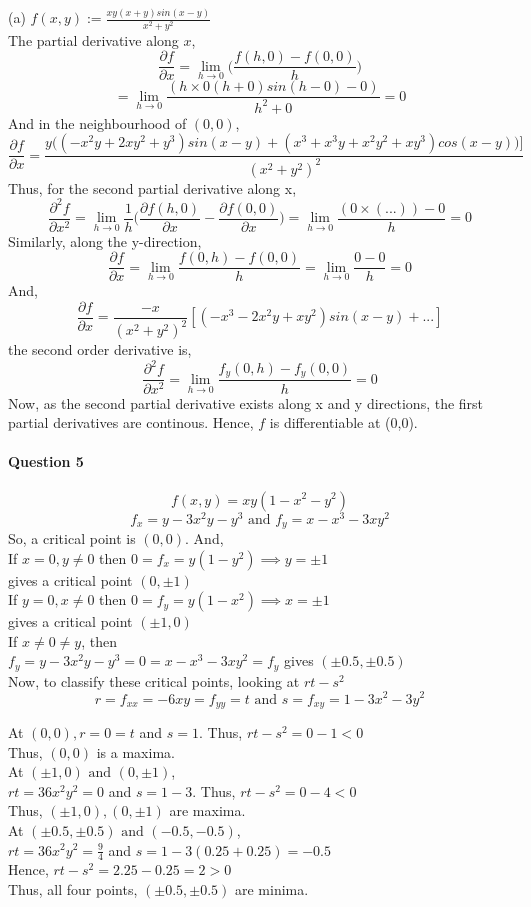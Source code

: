 \documentclass[20pt,a4paper]{extarticle} %
\theoremstyle{definition}
\theoremstyle{definition}
\begin{document}
(a) $f(x,y):=\frac{xy(x+y)sin(x-y)}{x^2+y^2}$\\
The partial derivative along $x$,
\[ \frac{\partial f}{\partial x} =\lim_{h \to 0} \Big( \frac{f(h,0)-f(0,0)}{h} \Big) \]
\[=\lim_{h \to 0} \frac{(h\times 0(h+0)sin(h-0)-0)}{h^2+0}=0 \]
And in the neighbourhood of $(0,0)$,
\[ \frac{\partial f}{\partial x} = \frac{y\big( (-x^2y+2xy^2+y^3)sin(x-y)+(x^3+x^3y+x^2y^2+xy^3)cos(x-y) \big)]}{(x^2+y^2)^2} \]
Thus, for the second partial derivative along x,
\[ \frac{\partial^2 f}{\partial x^2}=\lim_{h \to 0} \frac{1}{h} \Big( \frac{\partial f (h,0)}{\partial x}
-\frac{\partial f (0,0)}{\partial x} \Big)= \lim_{h \to 0} \frac{(0\times (...))-0}{h}=0 \]
Similarly, along the y-direction, \\
\[ \frac{\partial f}{\partial x} = \lim_{h \to 0} \frac{f(0,h)-f(0,0)}{h}= \lim_{h \to 0}
\frac{0-0}{h}=0\]
And,
\[  \frac{\partial f}{\partial x} = \frac{-x}{(x^2+y^2)^2}[(-x^3-2x^2y+xy^2)sin(x-y)+...]\]
the second order derivative is,
\[ \frac{\partial^2 f}{\partial x^2} = \lim_{h \to 0} \frac{f_y(0,h)-f_y(0,0)}{h}=0 \]
Now, as the second partial derivative exists along x and y directions, the first partial derivatives are continous. Hence, $f$ is differentiable at (0,0).
\newpage
\paragraph{Question 5}
\[ f(x,y)=xy(1-x^2-y^2) \]
\[ f_x=y-3x^2y-y^3 \text{ and }f_y=x-x^3-3xy^2  \]
So, a critical point is $(0,0)$. And,\\
If $x=0,y\neq0$ then $0=f_x=y(1-y^2) \implies y= \pm 1$\\gives a critical point $(0,\pm 1)$\\
If $y=0,x\neq0$ then $0=f_y=y(1-x^2) \implies x= \pm 1$ \\gives a critical point $(\pm 1,0)$\\

If $x\neq 0 \neq y$, then \\
$f_y=y-3x^2y-y^3=0=x-x^3-3xy^2=f_y$ gives $(\pm 0.5, \pm 0.5)$ \\
Now, to classify these critical points, looking at $rt-s^2$
\[ r=f_{xx}=-6xy=f_{yy}=t \text{ and } s=f_{xy}=1-3x^2-3y^2 \]

At $(0,0), r=0=t$ and $s=1$. Thus, $rt-s^2=0-1<0$\\
Thus, $(0,0)$ is a maxima.\\

At $(\pm 1,0) \text{ and } (0, \pm 1)$,\\
$rt=36x^2y^2=0$ and $s=1-3$. Thus, $rt-s^2=0-4<0$\\
Thus, $(\pm 1,0) , (0, \pm 1)$ are maxima.\\

At $(\pm 0.5,\pm 0.5) \text{ and } (-0.5,-0.5)$,\\
$rt=36x^2y^2=\frac{9}{4}$ and $s=1-3(0.25+0.25)=-0.5$\\
Hence, $rt-s^2=2.25-0.25=2>0$ \\
Thus, all four points, $ (\pm 0.5,\pm 0.5) $ are minima.
\end{document}
